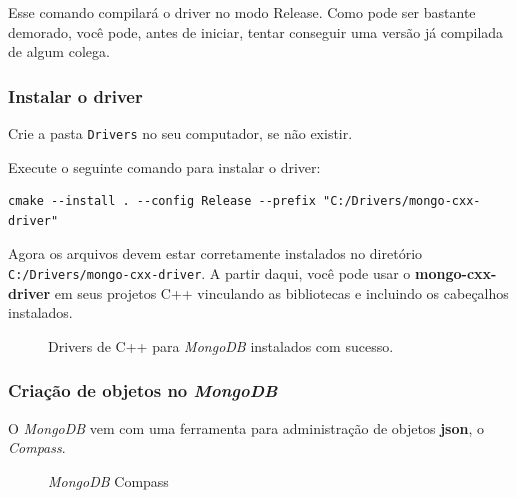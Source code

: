 \documentclass[a4paper,11pt]{article}
\newcommand{\mongo}{\textit{MongoDB}}
\begin{document}
Esse comando compilará o driver no modo Release. Como pode ser bastante demorado, você pode, antes de iniciar, tentar conseguir uma versão já compilada de algum colega.

\subsubsection{Instalar o driver}

Crie a pasta {\tt Drivers} no seu computador, se não existir.

Execute o seguinte comando para instalar o driver:
\begin{mdframed}
	\begin{verbatim}
cmake --install . --config Release --prefix "C:/Drivers/mongo-cxx-driver"
	\end{verbatim}
\end{mdframed}

Agora os arquivos devem estar corretamente instalados no diretório {\tt C:/Drivers/mongo-cxx-driver}. A partir daqui, você pode usar o \textbf{mongo-cxx-driver} em seus projetos C++ vinculando as bibliotecas e incluindo os cabeçalhos instalados.

\begin{figure}[H]
	\centering
	\caption{Drivers de C++ para \mongo{} instalados com sucesso.}\label{fig:mongodb_drivers}
\end{figure}

\subsubsection{Criação de objetos no \mongo{}}

O \mongo{} vem com uma ferramenta para administração de objetos \textbf{json}, o \textit{Compass}.
\begin{figure}[H]
	\centering
	\caption{\mongo{} Compass}\label{fig:mongo_compass}
\end{figure}
\end{document}
